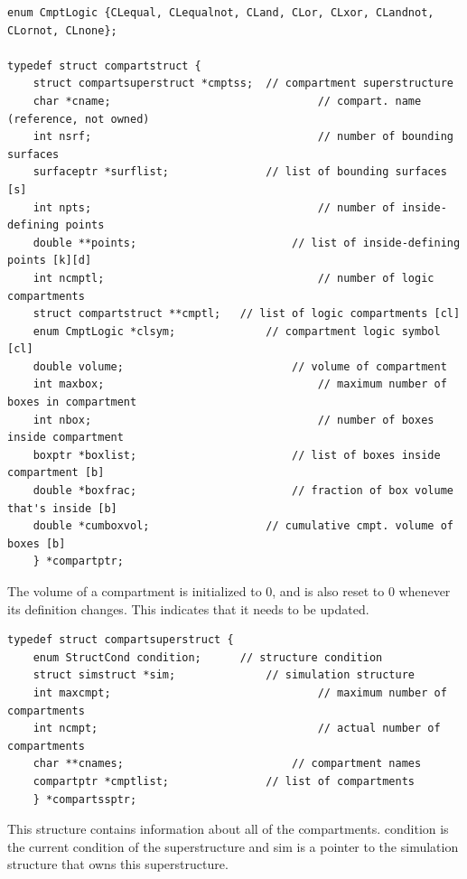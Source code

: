 \documentclass {scrbook}
\begin{document}
\begin{lstlisting}
enum CmptLogic {CLequal, CLequalnot, CLand, CLor, CLxor, CLandnot, CLornot, CLnone};

typedef struct compartstruct {
	struct compartsuperstruct *cmptss;	// compartment superstructure
	char *cname;								// compart. name (reference, not owned)
	int nsrf;									// number of bounding surfaces
	surfaceptr *surflist;				// list of bounding surfaces [s]
	int npts;									// number of inside-defining points
	double **points;						// list of inside-defining points [k][d]
	int ncmptl;									// number of logic compartments
	struct compartstruct **cmptl;	// list of logic compartments [cl]
	enum CmptLogic *clsym;				// compartment logic symbol [cl]
	double volume;							// volume of compartment
	int maxbox;									// maximum number of boxes in compartment
	int nbox;									// number of boxes inside compartment
	boxptr *boxlist;						// list of boxes inside compartment [b]
	double *boxfrac;						// fraction of box volume that's inside [b]
	double *cumboxvol;					// cumulative cmpt. volume of boxes [b]
	} *compartptr;
\end{lstlisting}

The volume of a compartment is initialized to 0, and is also reset to 0 whenever its definition changes. This indicates that it needs to be updated.

\begin{lstlisting}
typedef struct compartsuperstruct {
	enum StructCond condition;		// structure condition
	struct simstruct *sim;				// simulation structure
	int maxcmpt;								// maximum number of compartments
	int ncmpt;									// actual number of compartments
	char **cnames;							// compartment names
	compartptr *cmptlist;				// list of compartments
	} *compartssptr;
\end{lstlisting}

This structure contains information about all of the compartments. condition is the current condition of the superstructure and sim is a pointer to the simulation structure that owns this superstructure.
\end{document}
